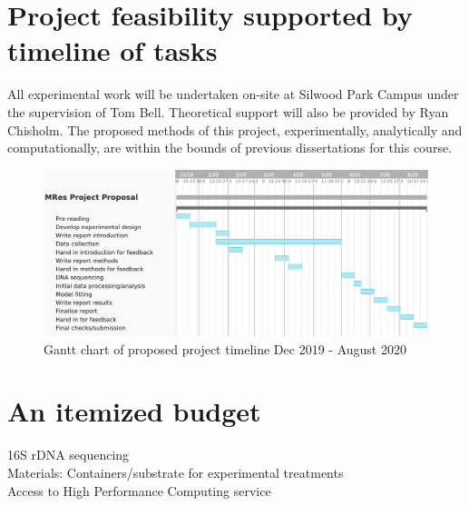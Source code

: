 \documentclass[11pt]{article}
\begin{document}
\section{Project feasibility supported by timeline of tasks}
All experimental work will be undertaken on-site at Silwood Park Campus under the supervision of Tom Bell. Theoretical support will also be provided by Ryan Chisholm. The proposed methods of this project, experimentally, analytically and computationally, are within the bounds of previous dissertations for this course. 
\begin{figure}[h!] 
	\includegraphics[width=\linewidth]{gantt_chart.png}
	\caption{Gantt chart of proposed project timeline Dec 2019 - August 2020} 
\end{figure}

\section{An itemized budget}
16S rDNA sequencing \\
Materials: Containers/substrate for experimental treatments \\
Access to High Performance Computing service 

  
  
  
\end{document}
